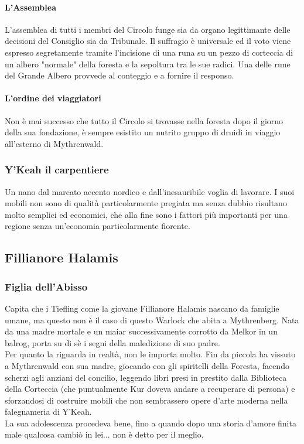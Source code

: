 \paragraph{L'Assemblea} L'assemblea di tutti i membri del Circolo funge sia da organo legittimante delle decisioni del Consiglio sia da Tribunale. Il suffragio è universale ed il voto viene espresso segretamente tramite l'incisione di una runa su un pezzo di corteccia di un albero "normale" della foresta e la sepoltura tra le sue radici. Una delle rune del Grande Albero provvede al conteggio e a fornire il responso.

\paragraph{L'ordine dei viaggiatori} Non è mai successo che tutto il Circolo si trovasse nella foresta dopo il giorno della sua fondazione, è sempre esistito un nutrito gruppo di druidi in viaggio all'esterno di Mythrenwald.

\subsubsection{Y'Keah il carpentiere}

Un nano dal marcato accento nordico e dall'inesauribile voglia di lavorare. I suoi mobili non sono di qualità particolarmente pregiata ma senza dubbio risultano molto semplici ed economici, che alla fine sono i fattori più importanti per una regione senza un'economia particolarmente fiorente.

\subsection{Fillianore Halamis}

\subsubsection{Figlia dell'Abisso}

Capita che i Tiefling come la giovane Fillianore Halamis nascano da famiglie umane, ma questo non è il caso di questo Warlock che abita a Mythrenberg. Nata da una madre mortale e un maiar successivamente corrotto da Melkor in un balrog, porta su di sè i segni della maledizione di suo padre. \\ Per quanto la riguarda in realtà, non le importa molto. Fin da piccola ha vissuto a Mythrenwald con sua madre, giocando con gli spiritelli della Foresta, facendo scherzi agli anziani del concilio, leggendo libri presi in prestito dalla Biblioteca della Corteccia (che puntualmente Kur doveva andare a recuperare di persona) e sforzandosi di costruire mobili che non sembrassero opere d'arte moderna nella falegnameria di Y'Keah. \\ La sua adolescenza procedeva bene, fino a quando dopo una storia d'amore finita male qualcosa cambiò in lei... non è detto per il meglio.

